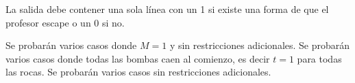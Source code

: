 \documentclass{oci}
\begin{document}
\begin{outputDescription}
  La salida debe contener una sola línea con un 1 si existe una forma de que el profesor escape o un 0
  si no.
\end{outputDescription}

\begin{scoreDescription}
  Se probarán varios casos donde $M = 1$ y sin restricciones adicionales.
  Se probarán varios casos donde todas las bombas caen al comienzo, es decir $t = 1$ para todas las rocas.
  Se probarán varios casos sin restricciones adicionales.
\end{scoreDescription}

\begin{sampleDescription}
\end{sampleDescription}
\end{document}

